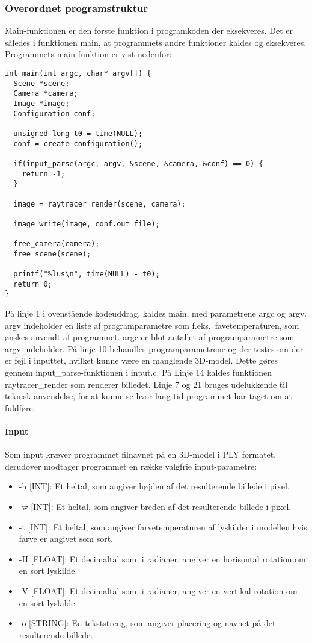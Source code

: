 \subsubsection{Overordnet programstruktur}
Main-funktionen er den første funktion i programkoden der eksekveres. Det er således i funktionen main, at programmets andre funktioner kaldes og eksekveres. Programmets main funktion er vist nedenfor:

\begin{lstlisting}[style=Cstyle, caption=Main]
int main(int argc, char* argv[]) {
  Scene *scene;
  Camera *camera;
  Image *image;
  Configuration conf;

  unsigned long t0 = time(NULL);
  conf = create_configuration();
  
  if(input_parse(argc, argv, &scene, &camera, &conf) == 0) {
    return -1;
  }
  
  image = raytracer_render(scene, camera);
  
  image_write(image, conf.out_file);

  free_camera(camera);
  free_scene(scene);
  
  printf("%lus\n", time(NULL) - t0);
  return 0;
}
\end{lstlisting}

På linje 1 i ovenstående kodeuddrag, kaldes main, med parametrene argc og argv. argv indeholder en liste af programparametre som f.eks.\ favetemperaturen, som ønskes anvendt af programmet. argc er blot antallet af programparametre som argv indeholder. På linje 10 behandles programparametrene og der testes om der er fejl i inputtet, hvilket kunne være en manglende 3D-model. Dette gøres gennem input\_parse-funktionen i input.c. På Linje 14 kaldes funktionen raytracer\_render som renderer billedet. Linje 7 og 21 bruges udelukkende til teknisk anvendelse, for at kunne se hvor lang tid programmet har taget om at fuldføre.

\paragraph{Input}
Som input kræver programmet filnavnet på en 3D-model i PLY formatet, derudover modtager programmet en række valgfrie input-parametre:
\begin{itemize}
  \item -h [INT]: Et heltal, som angiver højden af det resulterende billede i pixel.
  \item -w [INT]: Et heltal, som angiver breden af det resulterende billede i pixel.
  \item -t [INT]: Et heltal, som angiver farvetemperaturen af lyskilder i modellen hvis farve er angivet som sort.
  \item -H [FLOAT]: Et decimaltal som, i radianer, angiver en horisontal rotation om en sort lyskilde.
  \item -V [FLOAT]: Et decimaltal som, i radianer, angiver en vertikal rotation om en sort lyskilde.
  \item -o [STRING]: En tekststreng, som angiver placering og navnet på det resulterende billede.
\end{itemize}

